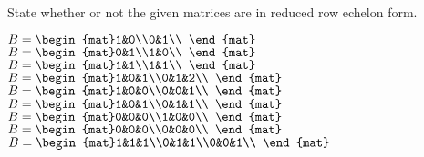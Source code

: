 

\begin{Exercise}[
name={},
title={}, 
difficulty=0,
origin={\cite{GH}}]
State whether or not the given matrices are in reduced row echelon form.
\begin{multicols}{2}
\Question $B = \begin{mat}1&0\\0&1\\ \end{mat}$
\Question $B = \begin{mat}0&1\\1&0\\ \end{mat}$
\Question $B = \begin{mat}1&1\\1&1\\ \end{mat}$
\Question $B = \begin{mat}1&0&1\\0&1&2\\ \end{mat}$
\Question $B = \begin{mat}1&0&0\\0&0&1\\ \end{mat}$
\Question $B = \begin{mat}1&0&1\\0&1&1\\ \end{mat}$
\Question $B = \begin{mat}0&0&0\\1&0&0\\ \end{mat}$
\Question $B = \begin{mat}0&0&0\\0&0&0\\ \end{mat}$
\Question $B = \begin{mat}1&1&1\\0&1&1\\0&0&1\\ \end{mat}$

\end{multicols}
\end{Exercise}
